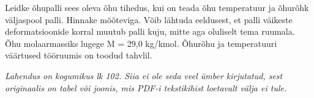 
Leidke õhupalli sees oleva õhu tihedus, kui on teada õhu temperatuur ja õhurõhk väljaspool palli. Hinnake mõõteviga. Võib lähtuda eeldusest, et palli väikeste deformatsioonide korral muutub palli kuju, mitte aga oluliselt tema ruumala. Õhu molaarmassiks lugege M = 29,0 kg/kmol. Õhurõhu ja temperatuuri väärtused tööruumis on toodud tahvlil.

\hint

\solu
\textit{Lahendus on kogumikus lk 102. Siia ei ole seda veel ümber kirjutatud, sest originaalis on tabel või joonis, mis PDF-i tekstikihist loetavalt välja ei tule.}
\probend
